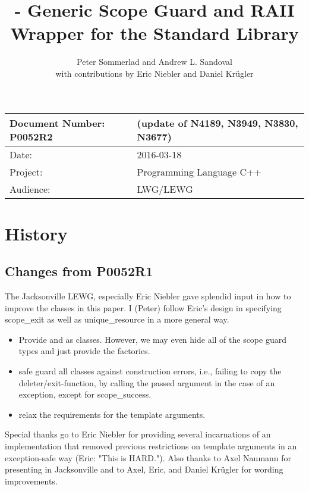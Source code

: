 \documentclass[ebook,11pt,article]{memoir}
\title{\papernumber{} - Generic Scope Guard and RAII Wrapper for the Standard Library}
\author{Peter Sommerlad and Andrew L. Sandoval\\with contributions by Eric Niebler and Daniel Kr\"ugler}
\date{\paperdate}                        %
\newcommand{\papernumber}{P0052R2}
\newcommand{\paperdate}{2016-03-18}
\begin{document}
\maketitle
\begin{tabular}[t]{|l|l|}\hline 
Document Number: \papernumber &   (update of N4189, N3949, N3830, N3677)\\\hline
Date: & \paperdate \\\hline
Project: & Programming Language C++\\\hline 
Audience: & LWG/LEWG\\\hline
\end{tabular}

\chapter{History}
\section{Changes from P0052R1}
The Jacksonville LEWG, especially Eric Niebler gave splendid input in how to improve the classes in this paper. I (Peter) follow Eric's design in specifying scope_exit as well as unique_resource in a more general way.
\begin{itemize}
\item Provide  and  as classes. However, we may even hide all of the scope guard types and just provide the factories.
\item safe guard all classes against construction errors, i.e., failing to copy the deleter/exit-function, by calling the passed argument in the case of an exception, except for scope_success.
\item relax the requirements for the template arguments.
\end{itemize}
Special thanks go to Eric Niebler for providing several incarnations of an implementation that removed previous restrictions on template arguments in an exception-safe way (Eric: "This is HARD."). Also thanks to Axel Naumann for presenting in Jacksonville and to Axel, Eric, and Daniel Kr\"ugler for wording improvements.
\end{document}
